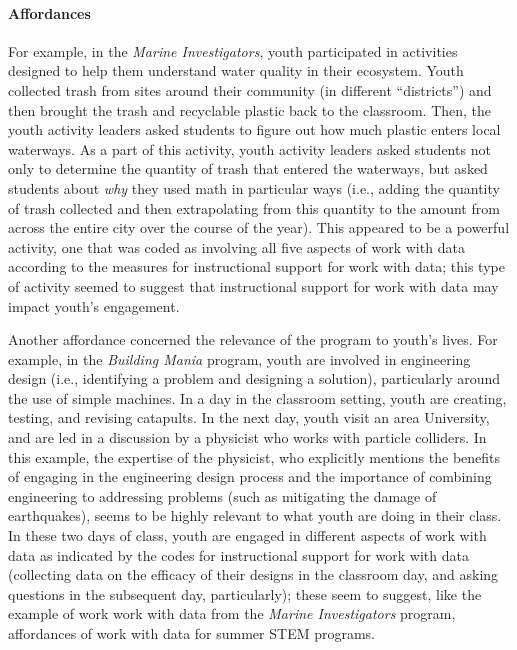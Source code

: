 \documentclass[]{msu-thesis}
\let\oldparagraph\paragraph
\renewcommand{\paragraph}[1]{\oldparagraph{#1}\mbox{}}
\theoremstyle{definition}
\theoremstyle{definition}
\theoremstyle{definition}
\theoremstyle{remark}
\begin{document}
\paragraph{Affordances}\label{affordances}

For example, in the \emph{Marine Investigators}, youth participated in
activities designed to help them understand water quality in their
ecosystem. Youth collected trash from sites around their community (in
different ``districts'') and then brought the trash and recyclable
plastic back to the classroom. Then, the youth activity leaders asked
students to figure out how much plastic enters local waterways. As a
part of this activity, youth activity leaders asked students not only to
determine the quantity of trash that entered the waterways, but asked
students about \emph{why} they used math in particular ways (i.e.,
adding the quantity of trash collected and then extrapolating from this
quantity to the amount from across the entire city over the course of
the year). This appeared to be a powerful activity, one that was coded
as involving all five aspects of work with data according to the
measures for instructional support for work with data; this type of
activity seemed to suggest that instructional support for work with data
may impact youth's engagement.

Another affordance concerned the relevance of the program to youth's
lives. For example, in the \emph{Building Mania} program, youth are
involved in engineering design (i.e., identifying a problem and
designing a solution), particularly around the use of simple machines.
In a day in the classroom setting, youth are creating, testing, and
revising catapults. In the next day, youth visit an area University, and
are led in a discussion by a physicist who works with particle
colliders. In this example, the expertise of the physicist, who
explicitly mentions the benefits of engaging in the engineering design
process and the importance of combining engineering to addressing
problems (such as mitigating the damage of earthquakes), seems to be
highly relevant to what youth are doing in their class. In these two
days of class, youth are engaged in different aspects of work with data
as indicated by the codes for instructional support for work with data
(collecting data on the efficacy of their designs in the classroom day,
and asking questions in the subsequent day, particularly); these seem to
suggest, like the example of work work with data from the \emph{Marine
Investigators} program, affordances of work with data for summer STEM
programs.
\end{document}
